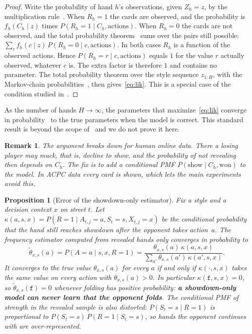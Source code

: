 \documentclass[11pt,a4paper]{article}
\newtheorem{proposition}{Proposition}
\newtheorem{remark}{Remark}
\newcommand{\C}{C}            %
\newcommand{\Sb}{S}           %
\newcommand{\Z}{Z}            %
\newcommand{\A}{A}            %
\newcommand{\X}{X}            %
\newcommand{\R}{R}            %
\newcommand{\1}{\mathbf{1}}
\newcommand{\BT}[1]{\cite[§#1]{bertsekas2000}}
\begin{document}
\begin{proof}
Write the probability of hand $h$'s observations, given $\Z_h=z$, by the
multiplication rule~\BT{1.3}. When $\R_h=1$ the cards are observed, and the
probability is $f_h(\C_h\mid z)$ times $P(\R_h=1\mid \C_h,\text{actions})$. When
$\R_h=0$ the cards are not observed, and the total probability
theorem~\BT{1.4} sums over the pairs still possible:
$\sum_c f_h(c\mid z)\,P(\R_h=0\mid c,\text{actions})$. In both cases $\R_h$ is a
function of the observed actions. Hence $P(\R_h=r\mid c,\text{actions})$ equals
$1$ for the value $r$ actually observed, whatever $c$ is. The extra factor is
therefore $1$ and contains no parameter. The total probability theorem over the
style sequence $z_{1:H}$, with the Markov-chain probabilities~\BT{6.1}, then
gives~\eqref{eq:lik}. This is a special case of the condition studied
in~\cite{rubin1976}.
\end{proof}

As the number of hands $H\to\infty$, the parameters that maximize~\eqref{eq:lik}
converge in probability~\BT{7.3} to the true parameters when the model is
correct. This standard result is beyond the scope of~\cite{bertsekas2000} and
we do not prove it here.

\begin{remark}
The argument breaks down for human online data. There a losing player may
\emph{muck}, that is, decline to show, and the probability of not revealing
then depends on $\C_h$. The fix is to add a conditional PMF
$P(\text{show}\mid \C_h,\text{won})$ to the model. In ACPC data every card is
shown, which lets the main experiments avoid this.
\end{remark}

\begin{proposition}[Error of the showdown-only estimator]\label{prop:bias}
Fix a style and a decision context $x$ on street $t$. Let
$\kappa(a,s,x)=P(\R=1\mid \A_{t,j}=a,\Sb_t=s,\X_{t,j}=x)$ be the conditional
probability that the hand still reaches showdown after the opponent takes
action~$a$. The frequency estimator computed from revealed hands only converges
in probability to
\begin{equation}
  \tilde\theta_{x,s}(a)=P(\A=a\mid s,x,\R=1)
  =\frac{\theta_{x,s}(a)\,\kappa(a,s,x)}{\sum_{a'}\theta_{x,s}(a')\,\kappa(a',s,x)}.
  \label{eq:bias}
\end{equation}
It converges to the true value $\theta_{x,s}(a)$ for every $a$ if and only if
$\kappa(\cdot,s,x)$ takes the same value on every action with
$\theta_{x,s}(a)>0$. In particular $\kappa(\mathtt{f},s,x)=0$, so
$\tilde\theta_{x,s}(\mathtt{f})=0$ whenever folding has positive probability:
\textbf{a showdown-only model can never learn that the opponent folds}. The
conditional PMF of strength in the revealed sample is also distorted:
$P(\Sb_t=s\mid\R=1)$ is proportional to $P(\Sb_t=s)\,P(\R=1\mid \Sb_t=s)$, so
hands the opponent continues with are over-represented.
\end{proposition}
\end{document}

